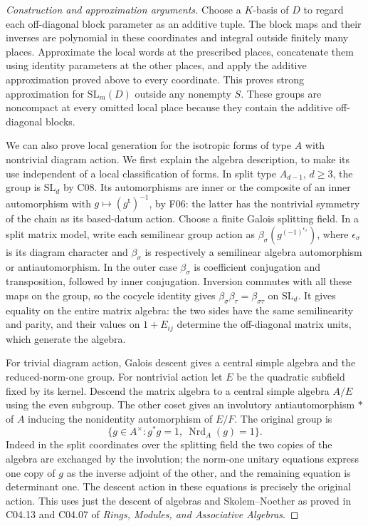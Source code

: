 \documentclass[11pt,a4paper,openany,oneside]{book}
\theoremstyle{resultstyle}
\theoremstyle{definition}
\numberwithin{equation}{chapter}
\newcommand{\SL}{\mathrm{SL}}
\begin{document}
\begin{proof}[Construction and approximation arguments]
Choose a \(K\)-basis of \(D\) to regard each off-diagonal
block parameter as an additive tuple. The block maps and
their inverses are polynomial in these coordinates and
integral outside finitely many places. Approximate the
local words at the prescribed places, concatenate them
using identity parameters at the other places, and apply
the additive approximation proved above to every
coordinate. This proves strong approximation for
\(\SL_m(D)\) outside any nonempty \(S\). These groups
are noncompact at every omitted local place because
they contain the additive off-diagonal blocks.

We can also prove local generation for the isotropic forms of
type \(A\) with nontrivial diagram action. We first explain
the algebra description, to make its use independent of a
local classification of forms. In split type \(A_{d-1}\),
\(d\geq3\), the group is \(\SL_d\) by C08. Its automorphisms
are inner or the composite of an inner automorphism with
\(g\mapsto(g^{\mathsf t})^{-1}\), by F06: the latter has the
nontrivial symmetry of the chain as its based-datum action.
Choose a finite Galois splitting field. In a split matrix
model, write each semilinear group action as
\(\beta_\sigma(g^{(-1)^{\epsilon_\sigma}})\), where
\(\epsilon_\sigma\) is its diagram character and
\(\beta_\sigma\) is respectively a semilinear algebra
automorphism or antiautomorphism. In the outer case
\(\beta_\sigma\) is coefficient conjugation and transposition,
followed by inner conjugation. Inversion commutes with
all these maps on the group, so the cocycle identity gives
\(\beta_\sigma\beta_\tau=\beta_{\sigma\tau}\) on \(\SL_d\).
It gives equality on the entire matrix algebra: the two
sides have the same semilinearity and parity, and their
values on \(1+E_{ij}\) determine the off-diagonal matrix
units, which generate the algebra.

For trivial diagram action, Galois descent gives a central
simple algebra and the reduced-norm-one group. For nontrivial
action let \(E\) be the quadratic subfield fixed by its kernel.
Descend the matrix algebra to a central simple algebra \(A/E\)
using the even subgroup. The other coset gives an involutory
antiautomorphism \(\ast\) of \(A\) inducing the nonidentity
automorphism of \(E/F\). The original group is
\[
 \{g\in A^\times:g^\ast g=1,\ \operatorname{Nrd}_A(g)=1\}.
\]
Indeed in the split coordinates over the splitting field
the two copies of the algebra are exchanged by the involution;
the norm-one unitary equations express one copy of \(g\)
as the inverse adjoint of the other, and the remaining equation
is determinant one. The descent action in these equations
is precisely the original action. This uses just the descent
of algebras and Skolem--Noether as proved in C04.13 and
C04.07 of \emph{Rings, Modules, and Associative Algebras}.


\end{proof}
\end{document}
